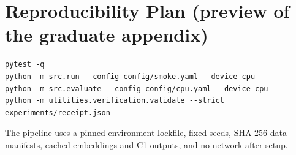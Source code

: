 \documentclass[10pt,letterpaper]{article}
\begin{document}
\section{Reproducibility Plan (preview of the graduate appendix)}

\begin{lstlisting}
pytest -q
python -m src.run --config config/smoke.yaml --device cpu
python -m src.evaluate --config config/cpu.yaml --device cpu
python -m utilities.verification.validate --strict experiments/receipt.json
\end{lstlisting}
The pipeline uses a pinned environment lockfile, fixed seeds, SHA-256 data manifests, cached
embeddings and C1 outputs, and no network after setup.
\end{document}
